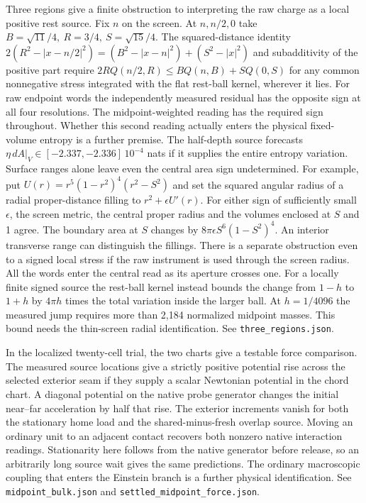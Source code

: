 \documentclass[11pt]{article}
\begin{document}
Three regions give a finite obstruction to interpreting the raw
charge as a local positive rest source. Fix \(n\) on the screen.
At \(n,n/2,0\) take \(B=\sqrt{11}/4,\ R=3/4,\ S=\sqrt{15}/4\).
The squared-distance identity
\(2(R^2-|x-n/2|^2)=(B^2-|x-n|^2)+(S^2-|x|^2)\)
and subadditivity of the positive part require
\(2R Q(n/2,R)\le BQ(n,B)+S Q(0,S)\) for any common nonnegative
stress integrated with the flat rest-ball kernel, wherever it lies.
For raw endpoint words the independently measured residual has the
opposite sign at all four resolutions. The midpoint-weighted
reading has the required sign throughout. Whether this second
reading actually enters the physical fixed-volume entropy is a
further premise. The half-depth source forecasts
\(\eta\,dA|_V\in[-2.337,-2.336]\,10^{-4}\) nats if it supplies
the entire entropy variation. Surface ranges alone leave even the
central area sign undetermined. For example, put
\(U(r)=r^5(1-r^2)^4(r^2-S^2)\) and set the squared angular radius
of a radial proper-distance filling to \(r^2+\epsilon U'(r)\).
For either sign of sufficiently small \(\epsilon\), the screen
metric, the central proper radius and the volumes enclosed at \(S\)
and 1 agree. The boundary area at \(S\) changes by
\(8\pi\epsilon S^6(1-S^2)^4\). An interior transverse range can
distinguish the fillings. There is a separate obstruction even to a
signed local stress if the raw instrument is used through the screen
radius. All the words enter the central read as its aperture crosses
one. For a locally finite signed source the rest-ball kernel instead
bounds the change from \(1-h\) to \(1+h\) by \(4\pi h\) times the
total variation inside the larger ball. At \(h=1/4096\) the measured
jump requires more than 2,184 normalized midpoint masses.
This bound needs the thin-screen radial identification. See
\texttt{three\_regions.json}.

In the localized twenty-cell trial, the two charts give a testable
force comparison. The measured source locations give a strictly
positive potential rise across the selected exterior seam if they
supply a scalar Newtonian potential in the chord chart. A diagonal
potential on the native probe generator changes the initial
near--far acceleration by half that rise. The exterior increments
vanish for both the stationary home load and the shared-minus-fresh
overlap source. Moving an ordinary unit to an adjacent contact
recovers both nonzero native interaction readings. Stationarity here
follows from the native generator before release, so an arbitrarily
long source wait gives the same predictions. The ordinary
macroscopic coupling that enters the Einstein branch is a further
physical identification. See \texttt{midpoint\_bulk.json} and
\texttt{settled\_midpoint\_force.json}.
\end{document}
